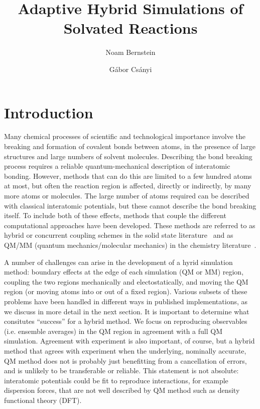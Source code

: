 \documentclass[11pt]{revtex4}
\begin{document}
\title{Adaptive Hybrid Simulations of Solvated Reactions}

\author{Noam Bernstein}

\author{G\'abor Cs\'anyi}

\maketitle

\section{Introduction}

Many chemical processes of scientific and technological importance
involve the breaking and formation of covalent bonds between atoms,
in the presence of large structures and large numbers of solvent
molecules.  Describing the bond breaking process requires a reliable
quantum-mechanical description of interatomic bonding.  However,
methods that can do this are limited to a few hundred atoms at most, but often
the reaction region is affected, directly or indirectly, by many
more atoms or molecules.  The large number of atoms required can
be described with classical interatomic potentials, but these cannot describe the bond breaking itself.  To include both of these
effects, methods that couple the different computational approaches
have been developed.  These methods are referred to as hybrid or
concurrent coupling schemes in the solid state
literature~\cite{curtin_model_simul_mater_sci_eng_2003a,csanyi_j_phys_condens_mater_2005a,bernstein_rep_prog_phys_2009a} and
as QM/MM (quantum mechanics/molecular mechanics) in the chemistry
literature~\cite{senn_topics_cur_chem_2007a,lin_theor_chem_acc_2005a}.

A number of challenges can arise in the development of a hyrid
simulation method: boundary effects at the edge of each simulation
(QM or MM) region, coupling the two regions mechanically and
electostatically, and moving the QM region (or moving atoms into
or out of a fixed region).  Various subsets of these problems have
been handled in different ways in published implementations, as we
discuss in more detail in the next section.  It is important to
determine what consitutes ``success'' for a hybrid method.  We focus
on reproducing observables (i.e. ensemble averages) in the QM region
in agreement with a full QM simulation.  Agreement with experiment
is also important, of course, but a hybrid method that agrees with
experiment when the underlying, nominally accurate, QM method does
not is probably just benefitting from a cancellation of errors, and
is unlikely to be transferable or reliable.  This statement is not
absolute: interatomic potentials could be fit to reproduce interactions,
for example dispersion forces, that are not well described by QM
method such as density functional theory (DFT).
\end{document}
